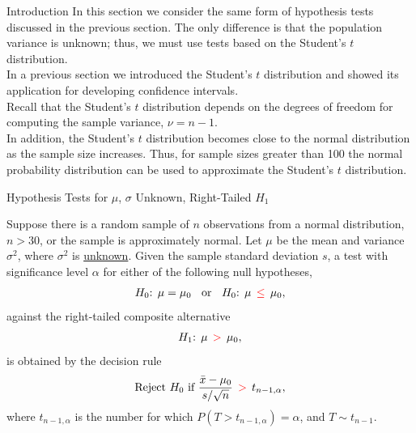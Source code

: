 \documentclass[pdf]{beamer}
\theoremstyle{remark}
\theoremstyle{definition}
\begin{document}
\begin{frame}[t]{Introduction}
In this section we consider the same form of hypothesis tests discussed in the previous section. The only difference is that the population variance is unknown; thus, we must use tests based on the Student's $t$ distribution. \\
\vspace{1.5ex}
In a previous section we introduced the Student's $t$ distribution and showed its application for developing confidence intervals. \\
\vspace{1.5ex}
Recall that the Student's $t$ distribution depends on the degrees of freedom for computing the sample variance, $\nu =  n-1$. \\
\vspace{1.5ex}
In addition, the Student's $t$ distribution becomes close to the normal distribution as the sample size increases. Thus, for sample sizes greater than 100 the normal probability distribution can be used to approximate the Student's $t$ distribution.
\end{frame}

\begin{frame}[t]{Hypothesis Tests for $\mu$, $\sigma$ Unknown, Right-Tailed $H_1$}
\small
\begin{tcolorbox}[colback=white!5,colframe=franklinblue]%
Suppose there is a random sample of $n$ observations from a normal distribution, $n > 30$, or the sample is approximately normal.  Let $\mu$ be the mean and variance $\sigma^2$, where $\sigma^2$ is \underline{unknown}.  Given the sample standard deviation $s$, a test with significance level $\alpha$ for either of the following null hypotheses, 
\vspace{-1.0ex}
\begin{align*} 
H_0\text{: }  \mu = \mu_0 \;\; \text{ or } \;\; H_0\text{: }  \mu \;\, \textcolor{red}{\leq} \;\, \mu_0, 
\end{align*} 
\vspace{-1.0ex}
against the right-tailed composite alternative 
\vspace{0.0ex}
\begin{align*} 
H_1\text{: }  \mu \;\, \textcolor{red}{>} \;\, \mu_0, 
\end{align*} 
\vspace{-1.0ex}
is obtained by the decision rule 
\vspace{0.0ex}
\begin{equation} 
\text{Reject } H_0 \text{ if } \frac{\bar{x} - \mu_0}{s/ \sqrt{n}} \;\, \textcolor{red}{>} \;\, t_{n-1,\alpha},
\end{equation} 
where $t_{n-1,\alpha}$ is the number for which $P(T > t_{n-1,\alpha}) = \alpha$, and $T \sim t_{n-1}$. 
\end{tcolorbox}
\end{frame}
\end{document}
